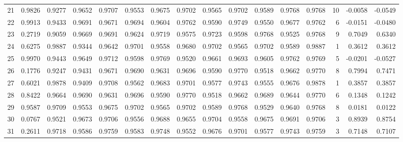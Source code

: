 \begin{tabular}{lrrrrrrrrrrrrrrr}
21  &      0.9826 &  0.9277 &  0.9652 &  0.9707 &  0.9553 &  0.9675 &  0.9702 &  0.9565 &  0.9702 &  0.9589 &   0.9768 &     0.9768 &     10 &                   -0.0058 &                    -0.0549 \\
22  &      0.9913 &  0.9433 &  0.9691 &  0.9671 &  0.9694 &  0.9604 &  0.9762 &  0.9590 &  0.9749 &  0.9550 &   0.9677 &     0.9762 &      6 &                   -0.0151 &                    -0.0480 \\
23  &      0.2719 &  0.9059 &  0.9669 &  0.9691 &  0.9624 &  0.9719 &  0.9575 &  0.9723 &  0.9598 &  0.9768 &   0.9525 &     0.9768 &      9 &                    0.7049 &                     0.6340 \\
24  &      0.6275 &  0.9887 &  0.9344 &  0.9642 &  0.9701 &  0.9558 &  0.9680 &  0.9702 &  0.9565 &  0.9702 &   0.9589 &     0.9887 &      1 &                    0.3612 &                     0.3612 \\
25  &      0.9970 &  0.9443 &  0.9649 &  0.9712 &  0.9598 &  0.9769 &  0.9520 &  0.9661 &  0.9693 &  0.9605 &   0.9762 &     0.9769 &      5 &                   -0.0201 &                    -0.0527 \\
26  &      0.1776 &  0.9247 &  0.9431 &  0.9671 &  0.9690 &  0.9631 &  0.9696 &  0.9590 &  0.9770 &  0.9518 &   0.9662 &     0.9770 &      8 &                    0.7994 &                     0.7471 \\
27  &      0.6021 &  0.9878 &  0.9409 &  0.9708 &  0.9562 &  0.9683 &  0.9701 &  0.9577 &  0.9743 &  0.9555 &   0.9676 &     0.9878 &      1 &                    0.3857 &                     0.3857 \\
28  &      0.8422 &  0.9664 &  0.9690 &  0.9631 &  0.9696 &  0.9590 &  0.9770 &  0.9518 &  0.9662 &  0.9689 &   0.9644 &     0.9770 &      6 &                    0.1348 &                     0.1242 \\
29  &      0.9587 &  0.9709 &  0.9553 &  0.9675 &  0.9702 &  0.9565 &  0.9702 &  0.9589 &  0.9768 &  0.9529 &   0.9640 &     0.9768 &      8 &                    0.0181 &                     0.0122 \\
30  &      0.0767 &  0.9521 &  0.9673 &  0.9706 &  0.9556 &  0.9688 &  0.9655 &  0.9704 &  0.9558 &  0.9675 &   0.9691 &     0.9706 &      3 &                    0.8939 &                     0.8754 \\
31  &      0.2611 &  0.9718 &  0.9586 &  0.9759 &  0.9583 &  0.9748 &  0.9552 &  0.9676 &  0.9701 &  0.9577 &   0.9743 &     0.9759 &      3 &                    0.7148 &                     0.7107 \\

\end{tabular}
